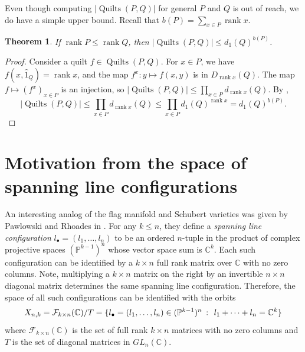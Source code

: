 \documentclass[12pt]{amsart}
\numberwithin{equation}{section}
\newtheorem{theorem}{Theorem}[section]
\theoremstyle{definition}
\newcommand{\quilt}{\operatorname{Quilts}}
\newcommand{\rank}{\operatorname{rank}}
\newcommand{\Fullrk}{\mathcal{F}_{k \times n}(\mathbb{C})}
\begin{document}
Even though computing $|\quilt(P,Q)|$ for general $P$ and $Q$ is
out of reach, we do have a simple upper bound. Recall that $b(P) = \sum_{x \in P}
\rank x$.

\begin{theorem} \label{thm:upperbound}
 If $\rank P \leq \rank Q$, then $|\quilt(P,Q)| \leq d_1(Q)^{b(P)}$.
\end{theorem}
\begin{proof}
Consider a quilt $f \in \quilt(P,Q)$. For $x \in P$, we have $f(x,\hat 1_Q) = \rank x$, and the map $f^x \colon y \mapsto f(x,y)$ is in $D_{\rank x}(Q)$. The map $f \mapsto (f^x)_{x \in P}$ is an injection, so $|\quilt(P,Q)| \leq \prod_{x \in P} d_{\rank x}(Q)$. By ,
$$|\quilt(P,Q)| \leq \prod_{x \in P} d_{\rank x}(Q) \leq \prod_{x \in P} d_1(Q)^{\rank x} = d_1(Q)^{b(P)}.$$
\end{proof}






\section{Motivation from the space of spanning line configurations}
\label{sec:motivation}




An interesting analog of the flag manifold and Schubert varieties was
given by Pawlowski and Rhoades in \cite{PR}.  For any $k\leq n$, they
define a \emph{spanning line configuration} $l_{\bullet} =
(l_1,\ldots,l_n)$ to be an ordered $n$-tuple in the product of complex
projective spaces $(\mathbb{P}^{k-1})^{n}$ whose vector space sum is
$\mathbb{C}^k$.  Each such configuration can be identified by a $k
\times n$ full rank matrix over $\mathbb{C}$ with no zero columns.
Note, multiplying a $k \times n$ matrix on the right by an invertible
$n \times n$ diagonal matrix determines the same spanning line
configuration.  Therefore, the space of all such configurations can be
identified with the orbits
\begin{equation}X_{n,k}= \Fullrk/T = \{l_{\bullet} = (l_1,\ldots,l_n)
\in (\mathbb{P}^{k-1})^n \hspace{0.05in} \colon \hspace{0.05in} l_1 +
\cdots + l_n = \mathbb{C}^k\}
\end{equation}
where $\Fullrk$ is the set of full rank $k \times n$ matrices with no
zero columns and $T$ is the set of diagonal matrices in
$GL_{n}(\mathbb{C})$. 
\end{document}
